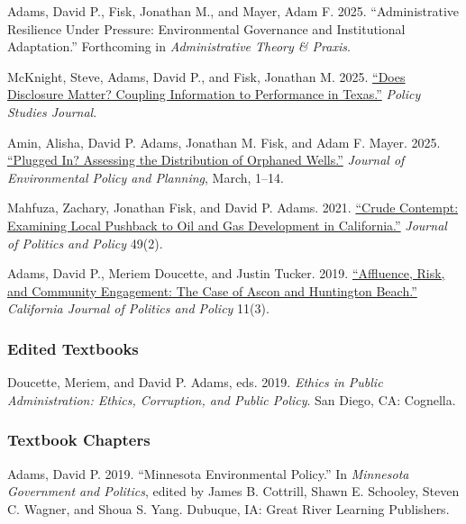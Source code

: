 \documentclass[12pt,letterpaper]{article}
\renewenvironment{itemize}{
  \begin{list}{}{
    \setlength{\leftmargin}{1.5em}
    \setlength{\itemsep}{0.25em}
    \setlength{\parskip}{0pt}
    \setlength{\parsep}{0.25em}
  }
}{
  \end{list}
}
\begin{document}
\begin{itemize}\leftmargin=2pt\itemindent=-15pt\leftmargin=2pt\itemindent=-15pt

    \item Adams, David P., Fisk, Jonathan M., and Mayer, Adam F. 2025. ``Administrative Resilience Under Pressure: Environmental Governance and Institutional Adaptation.'' Forthcoming in \emph{Administrative Theory \& Praxis}.

    \item McKnight, Steve, Adams, David P., and Fisk, Jonathan M. 2025. \href{https://doi.org/10.1111/psj.70064}{``Does Disclosure Matter? Coupling Information to Performance in Texas.''} \emph{Policy Studies Journal}.

    \item Amin, Alisha, David P. Adams, Jonathan M. Fisk, and Adam F. Mayer. 2025. \href{https://doi.org/10.1080/1523908X.2025.2480289}{``Plugged In? Assessing the Distribution of Orphaned Wells.''} \emph{Journal of Environmental Policy and Planning}, March, 1--14.

    \item Mahfuza, Zachary, Jonathan Fisk, and David P. Adams. 2021. \href{https://doi.org/10.1111/polp.12401}{``Crude Contempt: Examining Local Pushback to Oil and Gas Development in California.''} \emph{Journal of Politics and Policy} 49(2).

    \item Adams, David P., Meriem Doucette, and Justin Tucker. 2019. \href{https://escholarship.org/uc/item/2mz2n6qk}{``Affluence, Risk, and Community Engagement: The Case of Ascon and Huntington Beach.''} \emph{California Journal of Politics and Policy} 11(3).   

\end{itemize}

\subsubsection*{Edited Textbooks}
\begin{itemize}\leftmargin=2pt\itemindent=-15pt
    \item Doucette, Meriem, and David P. Adams, eds. 2019. \emph{Ethics in Public Administration: Ethics, Corruption, and Public Policy}. San Diego, CA: Cognella.
\end{itemize}

\subsubsection*{Textbook Chapters}
\begin{itemize}\leftmargin=2pt\itemindent=-15pt
    \item Adams, David P. 2019. ``Minnesota Environmental Policy.'' In \emph{Minnesota Government and Politics}, edited by James B. Cottrill, Shawn E. Schooley, Steven C. Wagner, and Shoua S. Yang. Dubuque, IA: Great River Learning Publishers.
\end{itemize}
\end{document}
